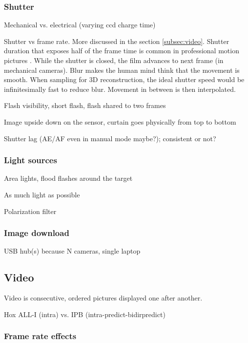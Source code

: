 \subsubsection{Shutter}

Mechanical vs. electrical (varying ccd charge time)

Shutter vs frame rate. More discussed in the section \ref{subsec:video}. Shutter duration that exposes half of the frame time is common in professional motion pictures \cite{wilson2004anton}. While the shutter is closed, the film advances to next frame (in mechanical cameras). Blur makes the human mind think that the movement is smooth. When sampling for 3D reconstruction, the ideal shutter speed would be infinitesimally fast to reduce blur. Movement in between is then interpolated.

Flash visibility, short flash, flash shared to two frames

Image upside down on the sensor, curtain goes physically from top to bottom

Shutter lag (AE/AF even in manual mode maybe?); consistent or not?


\subsubsection{Light sources}

Area lights, flood flashes around the target

As much light as possible


Polarization filter

\subsubsection{Image download}

USB hub(s) because N cameras, single laptop

\subsection{Video}

Video is consecutive, ordered pictures displayed one after another.

Hox ALL-I (intra) vs. IPB (intra-predict-bidirpredict)

\subsubsection{Frame rate effects}

